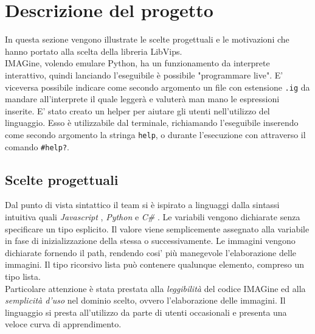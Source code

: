 \documentclass[10pt]{article}
\begin{document}
\section{Descrizione del progetto}In questa sezione vengono illustrate le scelte progettuali e le motivazioni che hanno portato alla scelta della libreria LibVips.\\
IMAGine, volendo emulare Python, ha un funzionamento da interprete interattivo, quindi lanciando l'eseguibile è possibile "programmare  live". E' viceversa possibile indicare come secondo argomento un file con estensione \texttt{.ig} da mandare all'interprete il quale leggerà e valuterà man mano le espressioni inserite. E' stato creato un helper per aiutare gli utenti nell'utilizzo del linguaggio. Esso è utilizzabile dal terminale, richiamando l'eseguibile inserendo come secondo argomento la stringa \texttt{help}, o durante l'esecuzione con attraverso il comando \texttt{\#help?}.
\subsection{Scelte progettuali}
Dal punto di vista sintattico il team si è ispirato a linguaggi dalla sintassi intuitiva quali \textit{Javascript} , \textit{Python} e \textit{C\#} . Le variabili vengono dichiarate senza specificare un tipo esplicito. Il valore viene semplicemente assegnato alla variabile in fase di inizializzazione della stessa o successivamente. Le immagini vengono dichiarate fornendo il path, rendendo cosi' più manegevole l'elaborazione delle immagini. Il tipo ricorsivo lista può contenere qualunque elemento, compreso un tipo lista.\\
Particolare attenzione è stata prestata alla \textit{leggibilità} del codice IMAGine ed alla \textit{semplicità d'uso} nel dominio scelto, ovvero l'elaborazione delle immagini. Il linguaggio si presta all'utilizzo da parte di utenti occasionali e presenta una veloce curva di apprendimento.
\end{document}
